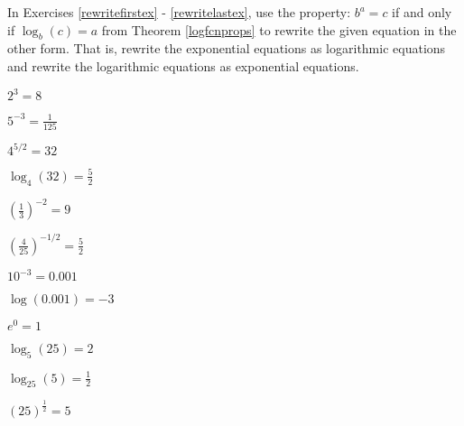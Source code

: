 \documentclass{ximera}
\begin{document}
	\author{Stitz-Zeager}


\begin{question}
In Exercises \ref{rewritefirstex} - \ref{rewritelastex}, use the property: $b^{a} = c$ if and only if $\log_{b}(c) = a$ from Theorem \ref{logfcnprops} to rewrite the given equation in the other form.  That is, rewrite the exponential equations as logarithmic equations and rewrite the logarithmic equations as exponential equations.

\begin{problem}\label{rewritefirstex}
$2^{3} = 8$
\end{problem}

\begin{problem}
$5^{-3} = \frac{1}{125}$
\end{problem}

\begin{problem}
$4^{5/2} = 32$ 

\begin{solution}
$\log_{4}(32) = \frac{5}{2}$
\end{solution}
\end{problem}

\begin{problem}
$\left(\frac{1}{3}\right)^{-2} = 9$ 
\end{problem}

\begin{problem}
$\left(\frac{4}{25}\right)^{-1/2} = \frac{5}{2}$  
\end{problem}

\begin{problem}
$10^{-3} = 0.001$ 

\begin{solution}
$\log(0.001) = -3$
\end{solution}
\end{problem}

\begin{problem}
$e^{0}  = 1$ 
\end{problem}

\begin{problem}
$\log_{5}(25) = 2$
\end{problem}

\begin{problem}
$\log_{25} (5) = \frac{1}{2}$

\begin{solution}
$(25)^{\frac{1}{2}} = 5$
\end{solution}
\end{problem}


\end{question}
\end{document}

